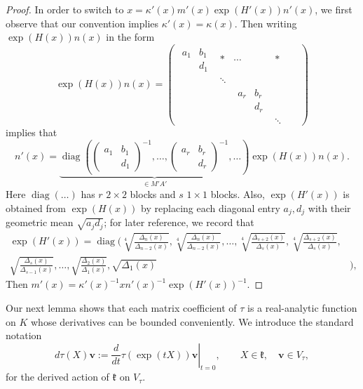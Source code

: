 \documentclass[11pt,oneside]{amsart}
\numberwithin{equation}{section}
\theoremstyle{remark}
\theoremstyle{plain}
\DeclareMathOperator{\diag}{diag}
\newcommand\mfk{\mathfrak{k}}
\newcommand{\bv}{\mathbf{v}}
\begin{document}
\begin{proof}
In order to switch to $x=\kappa'(x)m'(x)\exp(H'(x))n'(x)$, we first observe that our convention implies $\kappa'(x)=\kappa(x)$. Then writing $\exp(H(x))n(x)$ in the form
\[
\exp(H(x))n(x)=\begin{pmatrix} \boxed{\begin{matrix} a_1 & b_1 \\ & d_1 \end{matrix}} & * & \cdots & * \\ & \ddots & & & & \\ & & \boxed{\begin{matrix} a_r & b_r \\ & d_r \end{matrix}} & & \\ & & & \ddots \end{pmatrix}
\]
implies that
\[
n'(x)=\underbrace{\diag \left(\begin{pmatrix} a_1 & b_1 \\ & d_1 \end{pmatrix}^{-1},\dotsc,\begin{pmatrix} a_r & b_r \\ & d_r \end{pmatrix}^{-1},\dotsc\right)}_{\in M'A'} \exp(H(x)) n(x).
\]
Here $\diag(\dotsc)$ has $r$ $2\times 2$ blocks and $s$ $1\times 1$ blocks. Also, $\exp(H'(x))$ is obtained from $\exp(H(x))$ by replacing each diagonal entry $a_j,d_j$ with their geometric mean $\sqrt{a_jd_j}$; for later reference, we record that
\begin{equation}\label{eq:explicit-H'-0}
\begin{split}
\exp(H'(x))= \diag \Biggl(\sqrt[4]{\frac{\Delta_n(x)}{\Delta_{n-2}(x)}},\sqrt[4]{\frac{\Delta_n(x)}{\Delta_{n-2}(x)}},\dotsc,\sqrt[4]{\frac{\Delta_{s+2}(x)}{\Delta_{s}(x)}},\sqrt[4]{\frac{\Delta_{s+2}(x)}{\Delta_{s}(x)}},&\\ \sqrt{\frac{\Delta_{s}(x)}{\Delta_{s-1}(x)}},\dotsc,\sqrt{\frac{\Delta_2(x)}{\Delta_1(x)}},\sqrt{\Delta_1(x)}&\Biggr),
\end{split}
\end{equation}
Then $m'(x)=\kappa'(x)^{-1} x n'(x)^{-1} \exp(H'(x))^{-1}$.
\end{proof}

Our next lemma shows that each matrix coefficient of $\tau$ is a real-analytic function on $K$ whose derivatives can be bounded conveniently. We introduce the standard notation
\[
d\tau(X)\bv:= \left.\frac{d}{dt}\tau(\exp(tX))\bv \right|_{t=0},\qquad X\in\mfk,\quad \bv\in V_{\tau},
\]
for the derived action of $\mfk$ on $V_{\tau}$.
\end{document}
